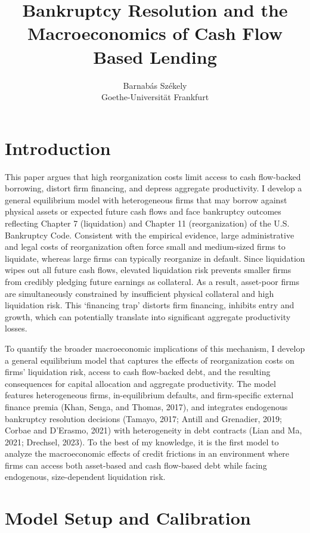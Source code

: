 \documentclass[12pt]{article}
\title{Bankruptcy Resolution and the Macroeconomics of Cash Flow Based Lending}
\author{Barnabás Székely \\ \small  Goethe-Universität Frankfurt}
\date{}
\begin{document}
\maketitle


\section{Introduction}

This paper argues that high reorganization costs limit access to cash flow-backed borrowing, distort firm financing, and depress aggregate productivity. I develop a general equilibrium model with heterogeneous firms that may borrow against physical assets or expected future cash flows and face bankruptcy outcomes reflecting Chapter 7 (liquidation) and Chapter 11 (reorganization) of the U.S. Bankruptcy Code. Consistent with the empirical evidence, large administrative and legal costs of reorganization often force small and medium-sized firms to liquidate, whereas large firms can typically reorganize in default. Since liquidation wipes out all future cash flows, elevated liquidation risk prevents smaller firms from credibly pledging future earnings as collateral. As a result, asset-poor firms are simultaneously constrained by insufficient physical collateral and high liquidation risk. This `financing trap' distorts firm financing, inhibits entry and growth, which can potentially translate into significant aggregate productivity losses.

To quantify the broader macroeconomic implications of this mechanism, I develop a general equilibrium model that captures the effects of reorganization costs on firms' liquidation risk, access to cash flow-backed debt, and the resulting consequences for capital allocation and aggregate productivity. The model features heterogeneous firms, in-equilibrium defaults, and firm-specific external finance premia (Khan, Senga, and Thomas, 2017), and integrates endogenous bankruptcy resolution decisions (Tamayo, 2017; Antill and Grenadier, 2019; Corbae and D'Erasmo, 2021) with heterogeneity in debt contracts (Lian and Ma, 2021; Drechsel, 2023). To the best of my knowledge, it is the first model to analyze the macroeconomic effects of credit frictions in an environment where firms can access both asset-based and cash flow-based debt while facing endogenous, size-dependent liquidation risk.

\section{Model Setup and Calibration}
\end{document}
